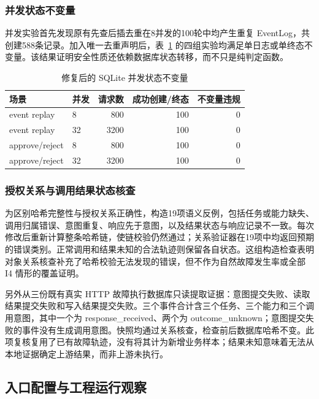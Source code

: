 \subsubsection{并发状态不变量}

并发实验首先发现原有先查后插去重在8并发的100轮中均产生重复 EventLog，共创建588条记录。加入唯一去重声明后，表~\ref{tab:concurrency-v11} 的四组实验均满足单日志或单终态不变量。该结果证明安全性质还依赖数据库状态转移，而不只是纯判定函数。

\begin{table}[htbp]
\centering
\caption{修复后的 SQLite 并发状态不变量}
\label{tab:concurrency-v11}
\small
\begin{tabular}{llrrr}
\toprule
场景 & 并发 & 请求数 & 成功创建/终态 & 不变量违规 \\
\midrule
event replay & 8 & 800 & 100 & 0 \\
event replay & 32 & 3200 & 100 & 0 \\
approve/reject & 8 & 800 & 100 & 0 \\
approve/reject & 32 & 3200 & 100 & 0 \\
\bottomrule
\end{tabular}
\end{table}

\subsubsection{授权关系与调用结果状态核查}
\label{sec:evidence-rr022}

为区别哈希完整性与授权关系正确性，构造19项语义反例，包括任务或能力缺失、调用归属错误、意图重复、响应先于意图，以及结果状态与响应记录不一致。每次修改后重新计算整条哈希链，使链校验仍然通过；关系验证器在19项中均返回预期的错误类别。正常调用和结果未知的合法轨迹则保留各自状态。这组构造检查表明对象关系核查补充了哈希校验无法发现的错误，但不作为自然故障发生率或全部 I4 情形的覆盖证明。

另外从三份既有真实 HTTP 故障执行数据库只读提取证据：意图提交失败、读取结果提交失败和写入结果提交失败。三个事件合计含三个任务、三个能力和三个调用意图，其中一个为 response\_received、两个为 outcome\_unknown；意图提交失败的事件没有生成调用意图。快照均通过关系核查，检查前后数据库哈希不变。此项复核复用了已有故障轨迹，没有将其计为新增业务样本；结果未知意味着无法从本地证据确定上游结果，而非上游未执行。

\subsection{入口配置与工程运行观察}
\label{sec:engineering-rr022}

